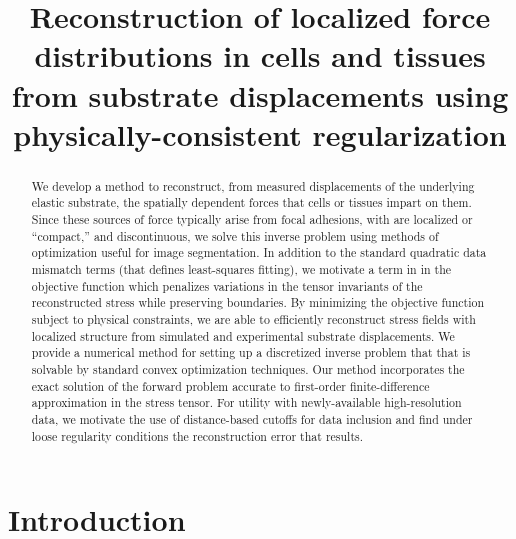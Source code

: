 \documentclass[aps,prl,reprint,twocolumn,groupedaddress,showpacs]{revtex4-1}
\begin{document}
\title{Reconstruction of localized force distributions in cells and tissues from substrate displacements using physically-consistent regularization}







\begin{abstract}
We develop a method to reconstruct, from measured displacements of the
underlying elastic substrate, the spatially dependent forces that
cells or tissues impart on them. Since these sources of force
typically arise from focal adhesions, with are localized or
``compact,'' and discontinuous, we solve this inverse problem using
methods of optimization useful for image segmentation. In addition to
the standard quadratic data mismatch terms (that defines least-squares
fitting), we motivate a term in in the objective function which
penalizes variations in the tensor invariants of the reconstructed stress while
preserving boundaries.   By minimizing
the objective function subject to physical constraints, we are able to
efficiently reconstruct stress fields with localized structure from
simulated and experimental substrate displacements. We provide a
numerical method for setting up a discretized inverse problem that that
 is solvable by standard convex optimization techniques. Our method incorporates
the exact solution of the forward problem accurate to first-order finite-difference approximation
in the stress tensor. For utility with newly-available high-resolution data, we motivate
the use of distance-based cutoffs for data inclusion and find under loose regularity
conditions the reconstruction error that results.
\end{abstract}
\maketitle

\section{Introduction}
\end{document}
